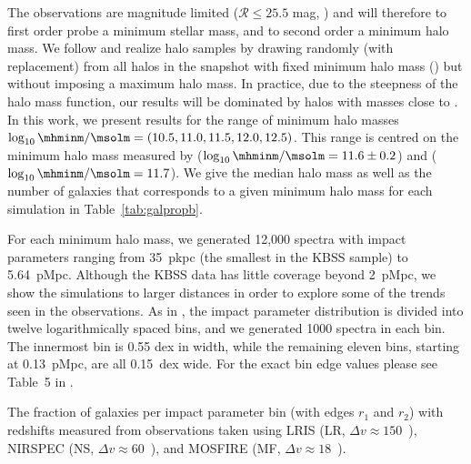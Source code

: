 \documentclass[useAMS,usenatbib,letterpaper]{mn2e}
\def\obspaper{\citetalias{turner14}}
\begin{document}
The observations are magnitude limited ($\mathcal{R} \leq 25.5$ mag,
\citealt{steidel10}) and will therefore to first order
probe a minimum stellar mass, and to second order a minimum halo mass. 
We follow \citet{rakic13} and realize halo samples by drawing randomly 
(with replacement) from all halos in the snapshot with fixed 
minimum halo mass (\mhmin) but without imposing a maximum halo mass. In practice,
due to the steepness of the halo mass function, our results will be dominated
by halos with masses close to \mhmin. 
In this work,
we present results for the range of minimum halo masses
$\log_{10}\mhminm/\msolm = (10.5, 11.0, 11.5, 12.0, 12.5)$.
This range is centred on the minimum halo mass measured by \citet{rakic13} 
($\log_{10}\mhminm/\msolm = 11.6\pm0.2$) and
 \citet{trainor12} ($\log_{10}\mhminm/\msolm = 11.7$). 
We give the median halo mass as well as the number of galaxies
that corresponds to a given minimum halo mass for each
simulation in Table~\ref{tab:galpropb}.



For each minimum halo mass, we generated 12,000 spectra with impact 
parameters ranging from 35~pkpc (the smallest in the KBSS sample)
to 5.64~pMpc. Although the KBSS data has little coverage beyond
2~pMpc, we show the simulations to larger distances
in order to explore some of the trends seen in the observations.
As in \obspaper,
the impact parameter distribution  is divided into twelve logarithmically 
spaced bins, and we generated 1000 
spectra in each bin. The innermost bin is 0.55 dex in width,
while the remaining eleven bins, starting at 0.13~pMpc, are all 0.15~dex wide.  	
For the exact bin edge values please see Table~5 in \obspaper.




 \begin{table}
 \caption{The fraction of galaxies per impact parameter bin (with edges $r_1$ and $r_2$)
   with redshifts measured from observations taken using 
   LRIS (LR, $\Delta v\approx150$~\kmps), 
   NIRSPEC (NS, $\Delta v\approx60$~\kmps), and 
   MOSFIRE (MF, $\Delta v\approx18$~\kmps). }

\label{tab:zerr}
\end{table}
\end{document}
